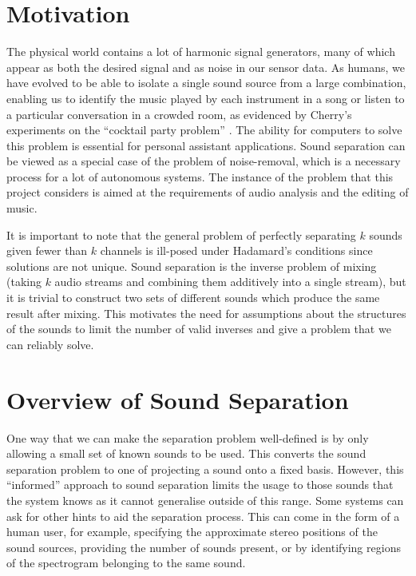 \documentclass[12pt,a4paper,twoside,openright]{report}
\begin{document}
\section{Motivation}

The physical world contains a lot of harmonic signal generators, many of which appear as both the desired signal and as noise in our sensor data. As humans, we have evolved to be able to isolate a single sound source from a large combination, enabling us to identify the music played by each instrument in a song or listen to a particular conversation in a crowded room, as evidenced by Cherry's experiments on the ``cocktail party problem'' \cite{cherry1953some}. The ability for computers to solve this problem is essential for personal assistant applications. Sound separation can be viewed as a special case of the problem of noise-removal, which is a necessary process for a lot of autonomous systems. The instance of the problem that this project considers is aimed at the requirements of audio analysis and the editing of music.

It is important to note that the general problem of perfectly separating $ k $ sounds given fewer than $ k $ channels is ill-posed under Hadamard's conditions \cite{hadamard1902problemes} since solutions are not unique. Sound separation is the inverse problem of mixing (taking $ k $ audio streams and combining them additively into a single stream), but it is trivial to construct two sets of different sounds which produce the same result after mixing. This motivates the need for assumptions about the structures of the sounds to limit the number of valid inverses and give a problem that we can reliably solve.

\section{Overview of Sound Separation}

One way that we can make the separation problem well-defined is by only allowing a small set of known sounds to be used. This converts the sound separation problem to one of projecting a sound onto a fixed basis. However, this ``informed'' approach to sound separation limits the usage to those sounds that the system knows as it cannot generalise outside of this range. Some systems can ask for other hints to aid the separation process. This can come in the form of a human user, for example, specifying the approximate stereo positions of the sound sources, providing the number of sounds present, or by identifying regions of the spectrogram belonging to the same sound.
\end{document}
